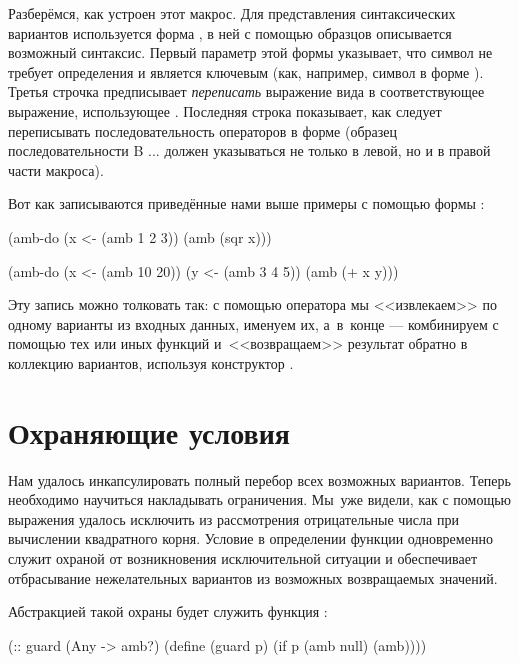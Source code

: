 Разберёмся, как устроен этот макрос. Для представления синтаксических вариантов используется форма , в ней с помощью образцов описывается возможный синтаксис. Первый параметр этой формы \s{(<-)} указывает, что символ \s{<-} не требует определения и является ключевым (как, например, символ  в форме ).
Третья строчка предписывает \emph{переписать} выражение вида  в соответствующее выражение, использующее . Последняя строка показывает, как следует переписывать последовательность операторов в форме  (образец последовательности {\schemestyle B ...} должен указываться не только в левой, но и в правой части макроса).

Вот как записываются приведённые нами выше примеры с помощью формы :

\begin{SchemeCode}
(amb-do (x <- (amb 1 2 3)) (amb (sqr x)))
\end{SchemeCode}

\begin{SchemeCode}
(amb-do 
  (x <- (amb 10 20))
  (y <- (amb 3 4 5)) 
  (amb (+ x y)))
\end{SchemeCode}

Эту запись можно толковать так: с помощью оператора \s{<-} мы <<извлекаем>> по одному варианты из входных данных, именуем их, а~в~конце --- комбинируем с помощью тех или иных функций и~<<возвращаем>> результат обратно в коллекцию вариантов, используя конструктор .

\section[2]{Охраняющие условия}%
Нам удалось инкапсулировать полный перебор всех возможных вариантов. Теперь необходимо научиться накладывать ограничения.
Мы~уже видели, как с помощью выражения  удалось исключить из рассмотрения отрицательные числа при вычислении квадратного корня. Условие в определении функции  одновременно служит охраной от возникновения исключительной ситуации и обеспечивает отбрасывание нежелательных вариантов из возможных возвращаемых значений.

Абстракцией такой охраны будет служить функция :

\begin{Definition}[emph={p}]
(:: guard (Any -> amb?)
  (define (guard p)
    (if p (amb null) (amb))))
\end{Definition}

